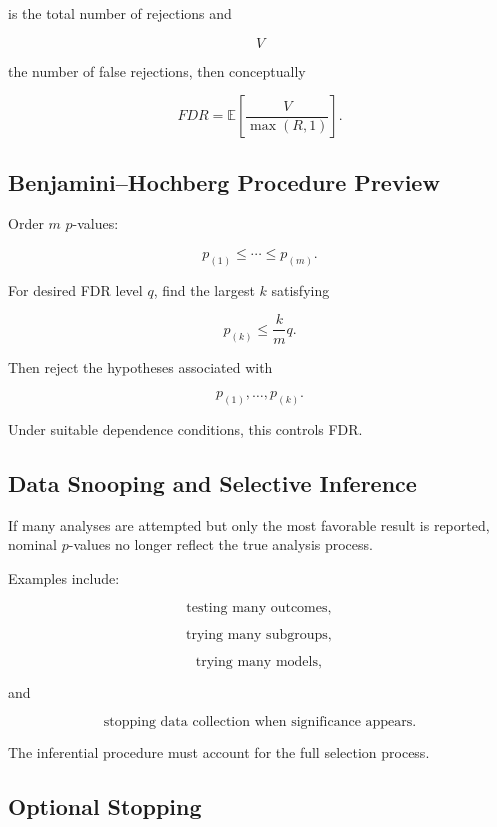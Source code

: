 is the total number of rejections and

\[
V
\]

the number of false rejections, then conceptually

\[
\boxed{
FDR
=
\mathbb{E}
\left[
\frac{
V
}{
\max(R,1)
}
\right].
}
\]

\subsection{Benjamini--Hochberg Procedure Preview}
\label{subsec:benjamini-hochberg-preview}

Order \(m\) \(p\)-values:

\[
p_{(1)}
\leq
\cdots
\leq
p_{(m)}.
\]

For desired FDR level \(q\), find the largest \(k\) satisfying

\[
\boxed{
p_{(k)}
\leq
\frac{k}{m}q.
}
\]

Then reject the hypotheses associated with

\[
p_{(1)},
\ldots,
p_{(k)}.
\]

Under suitable dependence conditions, this controls FDR.

\subsection{Data Snooping and Selective Inference}
\label{subsec:data-snooping}

If many analyses are attempted but only the most favorable result is
reported, nominal \(p\)-values no longer reflect the true analysis
process.

Examples include:

\[
\boxed{
\text{testing many outcomes},
}
\]

\[
\boxed{
\text{trying many subgroups},
}
\]

\[
\boxed{
\text{trying many models},
}
\]

and

\[
\boxed{
\text{stopping data collection when significance appears}.
}
\]

The inferential procedure must account for the full selection process.

\subsection{Optional Stopping}
\label{subsec:optional-stopping-testing}

